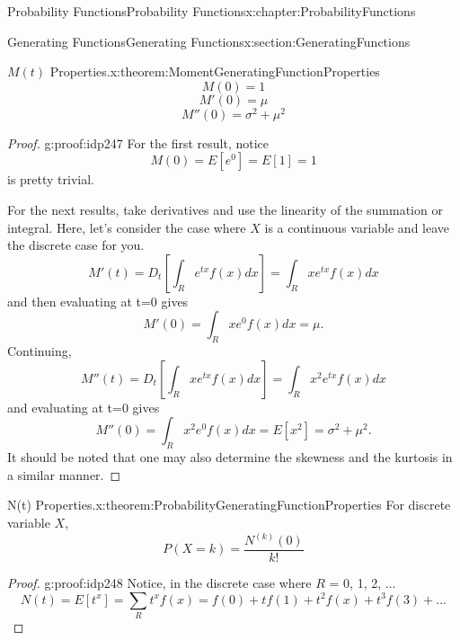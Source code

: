 \documentclass[oneside,10pt,]{book}
\numberwithin{equation}{section}
\begin{document}
\begin{chapterptx}{Probability Functions}{}{Probability Functions}{}{}{x:chapter:ProbabilityFunctions}
\begin{sectionptx}{Generating Functions}{}{Generating Functions}{}{}{x:section:GeneratingFunctions}
\begin{theorem}{\(M(t)\) Properties.}{}{x:theorem:MomentGeneratingFunctionProperties}
%
\begin{equation*}
M(0)=1
\end{equation*}
%
\begin{equation*}
M'(0)=\mu
\end{equation*}
%
\begin{equation*}
M''(0)=\sigma^2 + \mu^2
\end{equation*}
%
\end{theorem}
\begin{proof}{}{g:proof:idp247}
For the first result, notice%
\begin{equation*}
M(0) = E[e^{0}] = E[1] = 1
\end{equation*}
is pretty trivial.%
\par
For the next results, take derivatives and use the linearity of the summation or integral.  Here, let's consider the case where \(X\) is a continuous variable and leave the discrete case for you.%
\begin{equation*}
M'(t) = D_t \left [ \int_R e^{tx} f(x) dx \right ] = \int_R x e^{tx} f(x) dx
\end{equation*}
and then evaluating at t=0 gives%
\begin{equation*}
M'(0) = \int_R x e^{0} f(x) dx = \mu .
\end{equation*}
Continuing,%
\begin{equation*}
M''(t) = D_t \left [ \int_R x e^{tx} f(x) dx \right ] = \int_R x^2 e^{tx} f(x) dx
\end{equation*}
and evaluating at t=0 gives%
\begin{equation*}
M''(0) = \int_R x^2 e^{0} f(x) dx = E[x^2] = \sigma^2 + \mu^2.
\end{equation*}
It should be noted that one may also determine the skewness and the kurtosis in a similar manner.%
\end{proof}
\begin{theorem}{N(t) Properties.}{}{x:theorem:ProbabilityGeneratingFunctionProperties}%
For discrete variable \(X\),%
\begin{equation*}
P(X=k) = \frac{N^{(k)}(0)}{k!} 
\end{equation*}
%
\end{theorem}
\begin{proof}{}{g:proof:idp248}
Notice, in the discrete case where \(R\) = \textbraceleft{}0, 1, 2, ... \textbraceright{}%
\begin{equation*}
N(t) = E[t^x] = \sum_R t^x f(x) = f(0) + t f(1) + t^2 f(x) + t^3 f(3) + ...
\end{equation*}

\end{proof}
\end{sectionptx}
\end{chapterptx}
\end{document}
